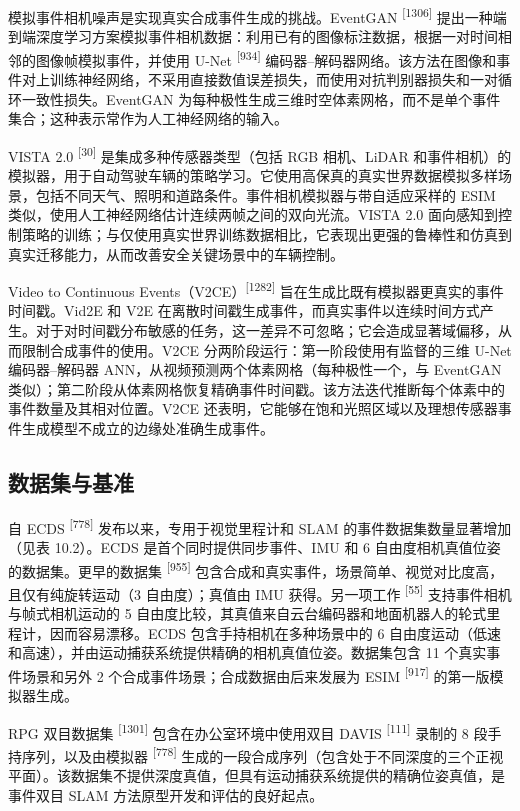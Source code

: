 模拟事件相机噪声是实现真实合成事件生成的挑战。EventGAN \textsuperscript{[1306]} 提出一种端到端深度学习方案模拟事件相机数据：利用已有的图像标注数据，根据一对时间相邻的图像帧模拟事件，并使用 U-Net \textsuperscript{[934]} 编码器--解码器网络。该方法在图像和事件对上训练神经网络，不采用直接数值误差损失，而使用对抗判别器损失和一对循环一致性损失。EventGAN 为每种极性生成三维时空体素网格，而不是单个事件集合；这种表示常作为人工神经网络的输入。

VISTA 2.0 \textsuperscript{[30]} 是集成多种传感器类型（包括 RGB 相机、LiDAR 和事件相机）的模拟器，用于自动驾驶车辆的策略学习。它使用高保真的真实世界数据模拟多样场景，包括不同天气、照明和道路条件。事件相机模拟器与带自适应采样的 ESIM 类似，使用人工神经网络估计连续两帧之间的双向光流。VISTA 2.0 面向感知到控制策略的训练；与仅使用真实世界训练数据相比，它表现出更强的鲁棒性和仿真到真实迁移能力，从而改善安全关键场景中的车辆控制。

Video to Continuous Events（V2CE）\textsuperscript{[1282]} 旨在生成比既有模拟器更真实的事件时间戳。Vid2E 和 V2E 在离散时间戳生成事件，而真实事件以连续时间方式产生。对于对时间戳分布敏感的任务，这一差异不可忽略；它会造成显著域偏移，从而限制合成事件的使用。V2CE 分两阶段运行：第一阶段使用有监督的三维 U-Net 编码器--解码器 ANN，从视频预测两个体素网格（每种极性一个，与 EventGAN 类似）；第二阶段从体素网格恢复精确事件时间戳。该方法迭代推断每个体素中的事件数量及其相对位置。V2CE 还表明，它能够在饱和光照区域以及理想传感器事件生成模型不成立的边缘处准确生成事件。

\subsection{数据集与基准}

自 ECDS \textsuperscript{[778]} 发布以来，专用于视觉里程计和 SLAM 的事件数据集数量显著增加（见表 10.2）。ECDS 是首个同时提供同步事件、IMU 和 6 自由度相机真值位姿的数据集。更早的数据集 \textsuperscript{[955]} 包含合成和真实事件，场景简单、视觉对比度高，且仅有纯旋转运动（3 自由度）；真值由 IMU 获得。另一项工作 \textsuperscript{[55]} 支持事件相机与帧式相机运动的 5 自由度比较，其真值来自云台编码器和地面机器人的轮式里程计，因而容易漂移。ECDS 包含手持相机在多种场景中的 6 自由度运动（低速和高速），并由运动捕获系统提供精确的相机真值位姿。数据集包含 11 个真实事件场景和另外 2 个合成事件场景；合成数据由后来发展为 ESIM \textsuperscript{[917]} 的第一版模拟器生成。

RPG 双目数据集 \textsuperscript{[1301]} 包含在办公室环境中使用双目 DAVIS \textsuperscript{[111]} 录制的 8 段手持序列，以及由模拟器 \textsuperscript{[778]} 生成的一段合成序列（包含处于不同深度的三个正视平面）。该数据集不提供深度真值，但具有运动捕获系统提供的精确位姿真值，是事件双目 SLAM 方法原型开发和评估的良好起点。

